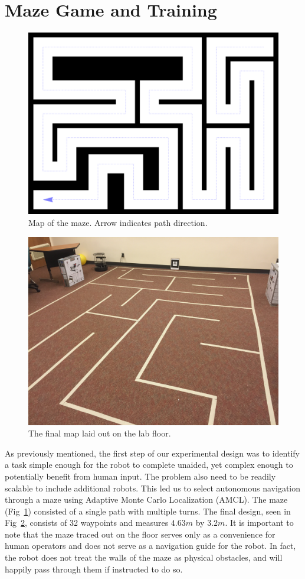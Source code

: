 \documentclass{sig-alternate}
\begin{document}
\section{Maze Game and Training}
  
\begin{figure}
\centering
\includegraphics[width=.5\textwidth]{maze-representation.png}
\caption{Map of the maze.  Arrow indicates path direction.}
\label{fig:maze_with_path}
\end{figure}

\begin{figure}
\centering 
\includegraphics[width=.5\textwidth]{tape_map.JPG} 
\caption{The final map laid out on the lab floor.}
\label{fig:map_floor_img}
\end{figure}

As previously mentioned, the first step of our experimental design was
to identify a task simple enough for the robot to complete unaided,
yet complex enough to potentially benefit from human input. The
problem also need to be readily scalable to include additional
robots. This led us to select autonomous navigation through a maze
using Adaptive Monte Carlo Localization (AMCL). The maze
(Fig~\ref{fig:maze_with_path}) consisted of a single path with
multiple  turns.  The final design, seen in
Fig~\ref{fig:map_floor_img}, consists of 32 waypoints and measures
$4.63m$ by $3.2m$. It is important to note that the maze traced out on
the floor serves only as a convenience for human operators and does
not serve as a navigation guide for the robot. In fact, the robot does
not treat the walls of the maze as physical obstacles, and will
happily pass through them if instructed to do so.
\end{document}
